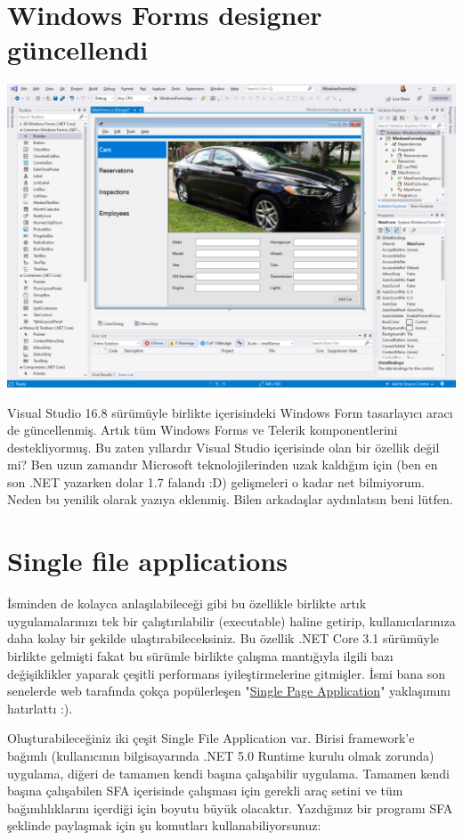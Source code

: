 \documentclass[11pt]{article}
\begin{document}
\section{Windows Forms designer güncellendi}
\label{sec:orgd174c2b}
\begin{center}
\includegraphics[width=.9\linewidth]{gorseller/winforms-designer.png}
\end{center}

Visual Studio 16.8 sürümüyle birlikte içerisindeki Windows Form tasarlayıcı
aracı de güncellenmiş. Artık tüm Windows Forms ve Telerik komponentlerini
destekliyormuş. Bu zaten yıllardır Visual Studio içerisinde olan bir özellik
değil mi? Ben uzun zamandır Microsoft teknolojilerinden uzak kaldığım için
(ben en son .NET yazarken dolar 1.7 falandı :D) gelişmeleri o kadar net
bilmiyorum. Neden bu yenilik olarak yazıya eklenmiş. Bilen arkadaşlar
aydınlatsın beni lütfen.
\section{Single file applications}
\label{sec:org181485d}
İsminden de kolayca anlaşılabileceği gibi bu özellikle birlikte artık
uygulamalarınızı tek bir çalıştırılabilir (executable) haline getirip,
kullanıcılarınıza daha kolay bir şekilde ulaştırabileceksiniz. Bu özellik .NET
Core 3.1 sürümüyle birlikte gelmişti fakat bu sürümle birlikte çalışma
mantığıyla ilgili bazı değişiklikler yaparak çeşitli performans
iyileştirmelerine gitmişler. İsmi bana son senelerde web tarafında çokça
popülerleşen "\href{https://en.wikipedia.org/wiki/Single-page\_application}{Single Page Application}" yaklaşımını hatırlattı :).

Oluşturabileceğiniz iki çeşit Single File Application var. Birisi framework'e
bağımlı (kullanıcının bilgisayarında .NET 5.0 Runtime kurulu olmak zorunda)
uygulama, diğeri de tamamen kendi başına çalışabilir uygulama. Tamamen kendi
başına çalışabilen SFA içerisinde çalışması için gerekli araç setini ve tüm
bağımlılıklarını içerdiği için boyutu büyük olacaktır. Yazdığınız bir programı
SFA şeklinde paylaşmak için şu komutları kullanabiliyorsunuz:
\end{document}

